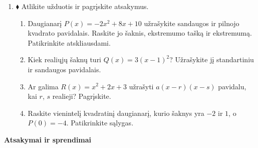 \documentclass[12pt,a4paper]{article}
\begin{document}
\begin{enumerate}[resume=uzdaviniai]
\item $\blacklozenge$ Atlikite užduotis ir pagrįskite atsakymus.
\begin{enumerate}
\item Daugianarį $P(x)=-2x^2+8x+10$ užrašykite sandaugos ir pilnojo kvadrato pavidalais. Raskite jo šaknis, ekstremumo tašką ir ekstremumą. Patikrinkite atskliausdami.
\item Kiek realiųjų šaknų turi $Q(x)=3(x-1)^2$? Užrašykite jį standartiniu ir sandaugos pavidalais.
\item Ar galima $R(x)=x^2+2x+3$ užrašyti $a(x-r)(x-s)$ pavidalu, kai $r$, $s$ realieji? Pagrįskite.
\item Raskite vienintelį kvadratinį daugianarį, kurio šaknys yra $-2$ ir $1$, o $P(0)=-4$. Patikrinkite sąlygas.
\end{enumerate}
\end{enumerate}
\newpage
\begin{center}{\Large\bfseries Atsakymai ir sprendimai}\end{center}
\end{document}
